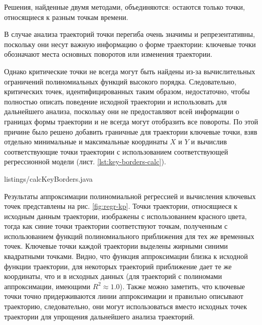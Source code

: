 Решения, найденные двумя методами, объединяются: остаются только точки, относящиеся к разным точкам времени.

В случае анализа траекторий точки перегиба очень значимы и репрезентативны, поскольку они несут важную информацию о форме траектории: ключевые точки обозначают места основных поворотов или изменения траектории.

Однако критические точки не всегда могут быть найдены из-за вычислительных ограничений полиномиальных функций высокого порядка. Следовательно, критических точек, идентифицированных таким образом, недостаточно, чтобы полностью описать поведение исходной траектории и использовать для дальнейшего анализа, поскольку они не предоставляют всей информации о границах формы траектории и не всегда могут отобразить все повороты. По этой причине было решено добавить граничные для траектории ключевые точки, взяв отдельно минимальные и максимальные координаты $X$ и $Y$ и вычислив соответствующие точки траектории с использованием соответствующей регрессионной модели (лист. \ref{lst:key-borders-calc}).

 {listings/calcKeyBorders.java}

Результаты аппроксимации полиномиальной регрессией и вычисления ключевых точек представлены на рис. \ref{fig:regr-kp}. Точки траектории, относящиеся к исходным данным траектории, изображены с использованием красного цвета, тогда как синие точки траектории соответствуют точкам, полученным с использованием функций полиномиального приближения для тех же временных точек. Ключевые точки каждой траектории выделены жирными синими квадратными точками. Видно, что функция аппроксимации близка к исходной функции траектории, для некоторых траекторий приближение дает те же координаты, что и в исходных данных (для траекторий с полиномами аппроксимации, имеющими $R^2 \approx 1.0$). Также можно заметить, что ключевые точки точно придерживаются линии аппроксимации и правильно описывают траекторию, следовательно, они могут использоваться вместо исходных точек траектории для упрощения дальнейшего анализа траекторий.

